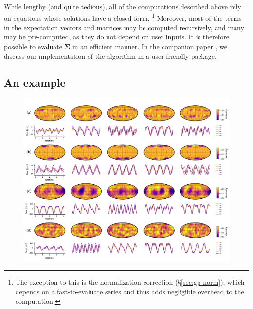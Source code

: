 \documentclass[modern,linenumbers]{aastex62}
\begin{document}
While lengthy (and quite tedious), all of the computations described above rely
on equations whose solutions have a closed form.%
%
\footnote{The exception to this is the
    normalization correction (\S\ref{sec:gp-norm}), which depends on a
    fast-to-evaluate series and thus adds negligible overhead to the computation.}
%
Moreover, most of the terms in the expectation vectors and matrices may
be computed recursively, and many may be pre-computed, as they do not
depend on user inputs.
%
It is therefore possible to evaluate $\tilde{\pmb{\Sigma}}$ in an
efficient manner. In the companion paper \citep{JOSSPaper}, we discuss our
implementation of the algorithm in a user-friendly \Python package.

\subsection{An example}
\label{sec:examples}

\begin{figure}[t!]
    \begin{centering}
        \includegraphics[width=\linewidth]{figures/samples.pdf}
    \end{centering}
\end{figure}
\end{document}
